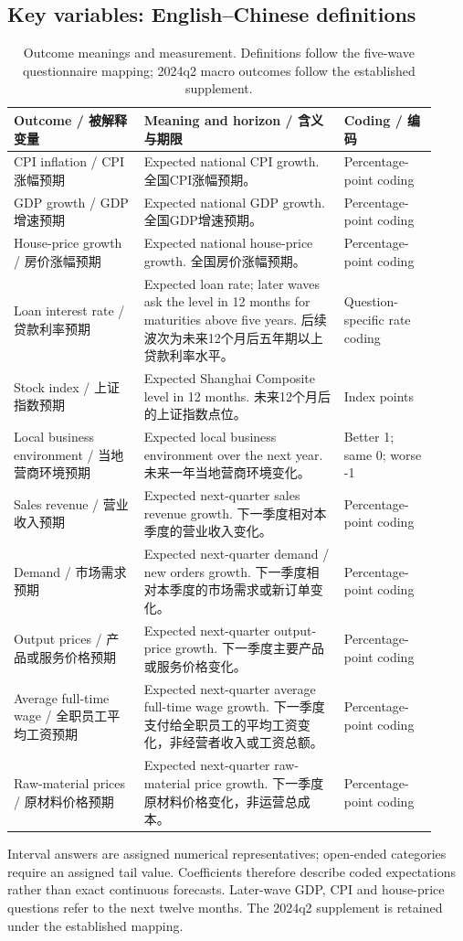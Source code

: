 \subsection{Key variables: English--Chinese definitions}
\begin{table}[H]
\centering
\small
\setlength{\tabcolsep}{4pt}
\caption{Outcome meanings and measurement. Definitions follow the five-wave questionnaire mapping; 2024q2 macro outcomes follow the established supplement.}
\begin{tabular}{p{0.29\linewidth}p{0.43\linewidth}p{0.20\linewidth}}
\toprule
Outcome / 被解释变量 & Meaning and horizon / 含义与期限 & Coding / 编码 \\
\midrule
CPI inflation / CPI涨幅预期 & Expected national CPI growth. 全国CPI涨幅预期。 & Percentage-point coding \\
GDP growth / GDP增速预期 & Expected national GDP growth. 全国GDP增速预期。 & Percentage-point coding \\
House-price growth / 房价涨幅预期 & Expected national house-price growth. 全国房价涨幅预期。 & Percentage-point coding \\
Loan interest rate / 贷款利率预期 & Expected loan rate; later waves ask the level in 12 months for maturities above five years. 后续波次为未来12个月后五年期以上贷款利率水平。 & Question-specific rate coding \\
Stock index / 上证指数预期 & Expected Shanghai Composite level in 12 months. 未来12个月后的上证指数点位。 & Index points \\
Local business environment / 当地营商环境预期 & Expected local business environment over the next year. 未来一年当地营商环境变化。 & Better 1; same 0; worse -1 \\
Sales revenue / 营业收入预期 & Expected next-quarter sales revenue growth. 下一季度相对本季度的营业收入变化。 & Percentage-point coding \\
Demand / 市场需求预期 & Expected next-quarter demand / new orders growth. 下一季度相对本季度的市场需求或新订单变化。 & Percentage-point coding \\
Output prices / 产品或服务价格预期 & Expected next-quarter output-price growth. 下一季度主要产品或服务价格变化。 & Percentage-point coding \\
Average full-time wage / 全职员工平均工资预期 & Expected next-quarter average full-time wage growth. 下一季度支付给全职员工的平均工资变化，非经营者收入或工资总额。 & Percentage-point coding \\
Raw-material prices / 原材料价格预期 & Expected next-quarter raw-material price growth. 下一季度原材料价格变化，非运营总成本。 & Percentage-point coding \\
\bottomrule
\end{tabular}
\end{table}
\noindent\small Interval answers are assigned numerical representatives; open-ended categories require an assigned tail value. Coefficients therefore describe coded expectations rather than exact continuous forecasts. Later-wave GDP, CPI and house-price questions refer to the next twelve months. The 2024q2 supplement is retained under the established mapping.\normalsize

